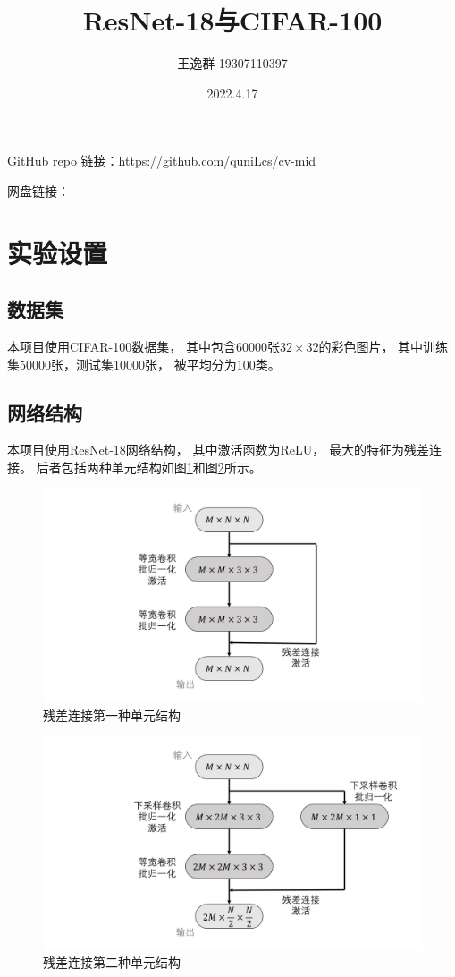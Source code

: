 \documentclass{article}
\title{ResNet-18与CIFAR-100}
\author{王逸群 19307110397}
\date{2022.4.17}
\begin{document}
\maketitle

GitHub repo 链接：https://github.com/quniLcs/cv-mid

网盘链接：

\section{实验设置}

\subsection{数据集}

本项目使用CIFAR-100数据集，
其中包含60000张$32\times32$的彩色图片，
其中训练集50000张，测试集10000张，
被平均分为100类。

\subsection{网络结构}

本项目使用ResNet-18网络结构，
其中激活函数为ReLU，
最大的特征为残差连接。
后者包括两种单元结构如图\ref{fig:GraphI}和图\ref{fig:GraphII}所示。

\begin{figure}[p]
\includegraphics[width=\linewidth]{graph/I.jpg}
\caption{残差连接第一种单元结构}
\label{fig:GraphI}
\end{figure}

\begin{figure}[p]
\includegraphics[width=\linewidth]{graph/II.jpg}
\caption{残差连接第二种单元结构}
\label{fig:GraphII}
\end{figure}
\end{document}
